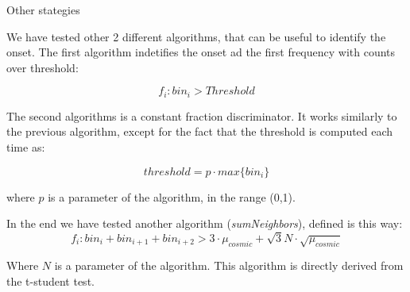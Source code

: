 \documentclass[8pt]{beamer}
\begin{document}
\begin{frame}{Other stategies}

We have tested other 2 different algorithms, that can be useful to identify the onset. The first algorithm indetifies the onset ad the first frequency with counts over threshold:

\begin{equation}
f_{i} : bin_{i} > Threshold
\end{equation}

The second algorithms is a constant fraction discriminator. It works similarly to the previous algorithm, except for the fact that the threshold is computed each time as:

\begin{equation}
threshold = p \cdot max\{bin_{i}  \}
\end{equation}

where $p$ is a parameter of the algorithm, in the range (0,1).

In the end we have tested another algorithm (\textit{sumNeighbors}), defined is this way:
\begin{equation}
f_{i} : bin_{i} + bin_{i+1} + bin_{i +2} > 3\cdot \mu_{cosmic} + \sqrt{3}   N \cdot \sqrt{\mu_{cosmic}} 
\end{equation}

Where $N$ is a parameter of the algorithm. This algorithm is directly derived from the t-student test.

\end{frame}
\end{document}
